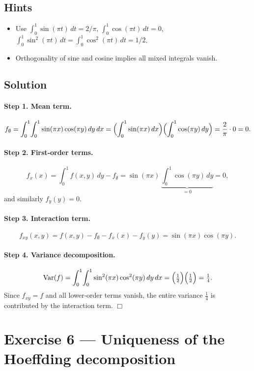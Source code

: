 \documentclass[a4paper]{article}
\begin{document}
\subsection*{Hints}
\begin{itemize}
  \item Use
        \(\int_0^1\sin(\pi t)\,dt=2/\pi\),
        \(\int_0^1\cos(\pi t)\,dt=0\),
        \(\int_0^1\sin^2(\pi t)\,dt=\int_0^1\cos^2(\pi t)\,dt=1/2\).
  \item Orthogonality of sine and cosine implies all mixed integrals vanish.
\end{itemize}

\subsection*{Solution}

\paragraph{Step 1. Mean term.}
\[
f_\emptyset
=\int_0^1\!\int_0^1\sin(\pi x)\cos(\pi y)\,dy\,dx
=\Bigl(\int_0^1\sin(\pi x)\,dx\Bigr)
 \Bigl(\int_0^1\cos(\pi y)\,dy\Bigr)
= \frac{2}{\pi}\cdot0 = 0.
\]

\paragraph{Step 2. First‐order terms.}
\[
f_x(x)
= \int_0^1 f(x,y)\,dy - f_\emptyset
= \sin(\pi x)\,\underbrace{\int_0^1\cos(\pi y)\,dy}_{=0}
= 0,
\]
and similarly $f_y(y)=0$.

\paragraph{Step 3. Interaction term.}
\[
f_{xy}(x,y)
= f(x,y) - f_\emptyset - f_x(x) - f_y(y)
= \sin(\pi x)\cos(\pi y).
\]

\paragraph{Step 4. Variance decomposition.}
\[
\text{Var}(f)
= \int_0^1\!\int_0^1 \sin^2(\pi x)\cos^2(\pi y)\,dy\,dx
= \Bigl(\tfrac12\Bigr)\Bigl(\tfrac12\Bigr)
= \tfrac14.
\]
Since $f_{xy}=f$ and all lower‐order terms vanish, the entire variance
$\tfrac14$ is contributed by the interaction term. \hfill\(\Box\)

\section*{Exercise 6 — Uniqueness of the Hoeffding decomposition}
\label{ex:FA_uniqueness_improved}
\end{document}
